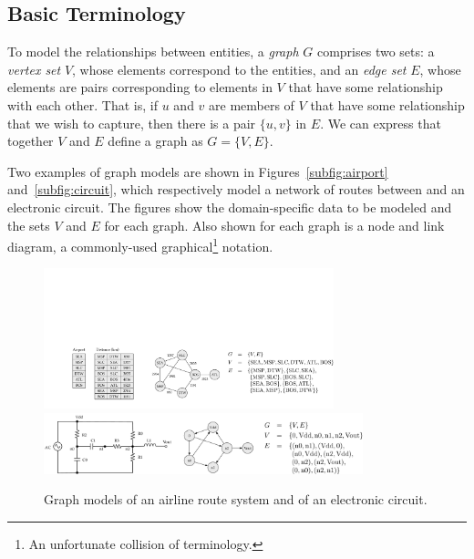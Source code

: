 \subsection{Basic Terminology}

To model the relationships between entities, a \emph{graph} $G$ comprises two sets:
a \emph{vertex set} $V$, whose elements correspond to the entities, and an \emph{edge set} $E$, whose
elements are pairs corresponding to elements in $V$ that have some relationship with each other.  That is,
if $u$ and $v$ are members of $V$ that have some relationship that we wish to capture, then there is
a pair $\{u, v\}$ in $E$.  We can express that together $V$ and $E$ define a graph as $G=\{V, E\}$.

Two examples of graph models are shown in Figures~\ref{subfig:airport} and~\ref{subfig:circuit},
which respectively model a network of routes between and an electronic circuit.  
The figures show the domain-specific data to be modeled and the sets $V$ and $E$ for each graph.
Also shown for each graph is a
 node and link diagram, a commonly-used graphical\footnote{An unfortunate collision of terminology.}
notation.

\begin{figure}[ht]
  \begin{center}
    {\includegraphics[width=0.75\textwidth]{figs/airport-summary.pdf}}
    \\
    {\includegraphics[width=0.825\textwidth]{figs/circuit-summary.pdf}}
    \caption{Graph models of an airline route system and of an electronic circuit.\label{fig:node_link_graphs}}
  \end{center}
\end{figure}


